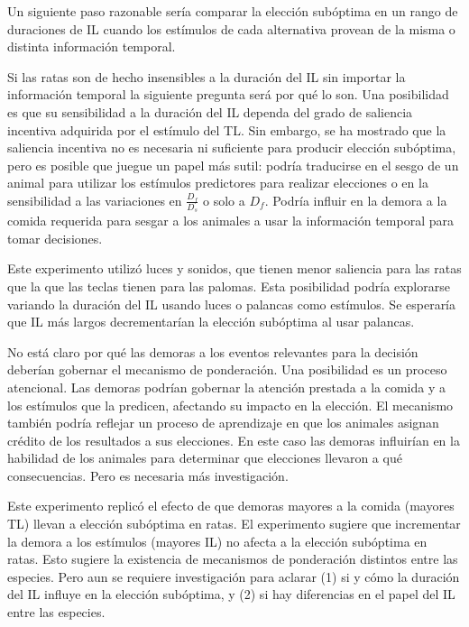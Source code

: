 \documentclass[a4paper,12pt]{article}
\begin{document}
Un siguiente paso razonable sería comparar la elección subóptima en un rango de duraciones de IL cuando los estímulos de cada alternativa provean de la misma o distinta información temporal.

Si las ratas son de hecho insensibles a la duración del IL sin importar la información temporal la siguiente pregunta será por qué lo son. Una posibilidad es que su sensibilidad a la duración del IL dependa del grado de saliencia incentiva adquirida por el estímulo del TL. Sin embargo, se ha mostrado que la saliencia incentiva no es necesaria ni suficiente para producir elección subóptima, pero es posible que juegue un papel más sutil: podría traducirse en el sesgo de un animal para utilizar los estímulos predictores para realizar elecciones o en la sensibilidad a las variaciones en $\frac{D_{f}}{D_{s}}$ o solo a $D_{f}$. Podría influir en la demora a la comida requerida para sesgar a los animales a usar la información temporal para tomar decisiones.

Este experimento utilizó luces y sonidos, que tienen menor saliencia para las ratas que la que las teclas tienen para las palomas. Esta posibilidad podría explorarse variando la duración del IL usando luces o palancas como estímulos. Se esperaría que IL más largos decrementarían la elección subóptima al usar palancas.

No está claro por qué las demoras a los eventos relevantes para la decisión deberían gobernar el mecanismo de ponderación. Una posibilidad es un proceso atencional. Las demoras podrían gobernar la atención prestada a la comida y a los estímulos que la predicen, afectando su impacto en la elección. El mecanismo también podría reflejar un proceso de aprendizaje en que los animales asignan crédito de los resultados a sus elecciones. En este caso las demoras influirían en la habilidad de los animales para determinar que elecciones llevaron a qué consecuencias. Pero es necesaria más investigación.

Este experimento replicó el efecto de que demoras mayores a la comida (mayores TL) llevan a elección subóptima en ratas. El experimento sugiere que incrementar la demora a los estímulos (mayores IL) no afecta a la elección subóptima en ratas. Esto sugiere la existencia de mecanismos de ponderación distintos entre las especies. Pero aun se requiere investigación para aclarar (1) si y cómo la duración del IL influye en la elección subóptima, y (2) si hay diferencias en el papel del IL entre las especies.
\end{document}
